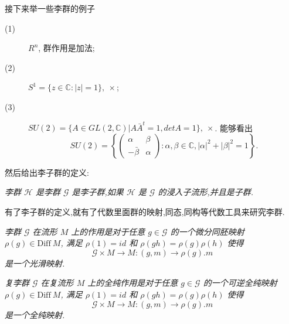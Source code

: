 
接下来举一些李群的例子
\begin{description}
	\item[(1)] $R^n$, 群作用是加法;
	\item[(2)] $S^1=\{z\in \mathbb{C}:|z|=1 \},~\times$;
	\item[(3)] $SU(2)=\{A \in GL(2,\mathbb{C})|A\bar{A}^t=1,det A = 1\},~\times$. 能够看出
	\begin{equation*}
		SU(2)=\left\lbrace\begin{pmatrix}
			\alpha&\beta\\
			-\bar{\beta}&\alpha
		\end{pmatrix}:\alpha,\beta\in\mathbb{C},|\alpha|^2+|\beta|^2 = 1
		 \right\rbrace.
	\end{equation*}
\end{description}

然后给出李子群的定义:
\begin{definition}[李子群]
	\emph{李群 $\mathcal{H}$ 是李群 $\mathcal{G}$ 是李子群,如果 $\mathcal{H}$ 是 $\mathcal{G}$ 的浸入子流形,并且是子群.}
\end{definition}

有了李子群的定义,就有了代数里面群的映射,同态,同构等代数工具来研究李群.

\begin{definition}[李群在流形上的作用]
	\emph{李群 $\mathcal{G}$ 在流形 $M$ 上的作用是对于任意 $g\in \mathcal{G}$ 的一个微分同胚映射 $\rho(g) \in \mathrm{Diff}~M$, 满足 $\rho(1) = id$ 和 $\rho(gh)=\rho(g)\rho(h)$ 使得
	\begin{equation*}
        \mathcal{G} \times M \to M : (g, m) \to \rho(g).m
	\end{equation*}
	是一个光滑映射.}
\end{definition}

\begin{definition}[复李群在复流形上的全纯作用]
	\emph{复李群 $\mathcal{G}$ 在复流形 $M$ 上的全纯作用是对于任意 $g\in \mathcal{G}$ 的一个可逆全纯映射 $\rho(g) \in \mathrm{Diff}~M$, 满足 $\rho(1) = id$ 和 $\rho(gh)=\rho(g)\rho(h)$ 使得
	\begin{equation*}
        \mathcal{G} \times M \to M : (g, m) \to \rho(g).m
	\end{equation*}
	是一个全纯映射.}
\end{definition}

